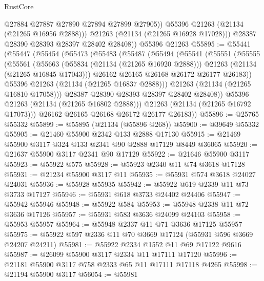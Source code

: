 \begin{lexlean}{RustCore}
\begin{coremodule}
                @27884
                @27887
                @27890
                @27894
                @27899
                @27905))
            @55396
            @21263
            (@21134 (@21265 @16956 @2888)))
          @21263
          (@21134 (@21265 @16928 @17028)))
        @28387
        @28390
        @28393
        @28397
        @28402
        @28408))
    @55396
    @21263
@55895 := @55441
    (@55447
      (@55454
        (@55473
          (@55483
            (@55487
              (@55494
                (@55541
                  (@55551
                    (@55555
                      (@55561
                        (@55663
                          (@55834 (@21134 (@21265 @16920 @2888)))
                          @21263
                          (@21134 (@21265 @16845 @17043)))
                        @26162
                        @26165
                        @26168
                        @26172
                        @26177
                        @26183))
                    @55396
                    @21263
                    (@21134 (@21265 @16837 @2888)))
                  @21263
                  (@21134 (@21265 @16810 @17058)))
                @28387
                @28390
                @28393
                @28397
                @28402
                @28408))
            @55396
            @21263
            (@21134 (@21265 @16802 @2888)))
          @21263
          (@21134 (@21265 @16792 @17073)))
        @26162
        @26165
        @26168
        @26172
        @26177
        @26183))
@55896 := @25765 @55332
@55899 := @55895 (@21134 (@55896 @268))
@55900 := @39649 @55332
@55905 := @21460 @55900 @2342 @133 @2888 @17130
@55915 := @21469 @55900 @3117 @324 @133 @2341 @90 @2888 @17129 @8449 @36065
@55920 := @21637 @55900 @3117 @2341 @90 @17129
@55922 := @21646 @55900 @3117
@55923 := @55922 @575
@55928 := @55923 @2340 @11 @74 @3618 @17128
@55931 := @21234 @55900 @3117 @11
@55935 := @55931 @574 @3618 @24027 @24031
@55936 := @55928 @55935
@55942 := @55922 @619 @2339 @11 @73 @3733 @17127
@55946 := @55931 @618 @3733 @24402 @24406
@55947 := @55942 @55946
@55948 := @55922 @584
@55953 := @55948 @2338 @11 @72 @3636 @17126
@55957 := @55931 @583 @3636 @24099 @24103
@55958 := @55953 @55957
@55964 := @55948 @2337 @11 @71 @3636 @17125 @55957
@55975 := @55922 @597 @2336 @11 @70 @3669 @17124 (@55931 @596 @3669 @24207 @24211)
@55981 := @55922 @2334 @1552 @11 @69 @17122 @9616
@55987 := @26099 @55900 @3117 @2334 @11 @17111 @17120
@55996 := @21181 @55900 @3117 @758 @2333 @65 @11 @17111 @17118 @4265
@55998 := @21194 @55900 @3117
@56054 := @55981

\end{coremodule}
\end{lexlean}

